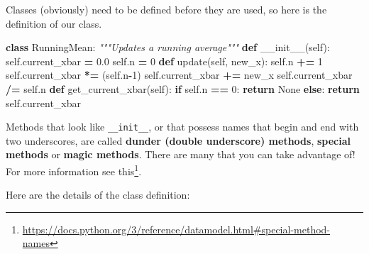 \documentclass[
  12pt,
  krantz2]{krantz}
\makeatletter
\newenvironment{Shaded}{\begin{snugshade}}{\end{snugshade}}
\newcommand{\CommentTok}[1]{\textcolor[rgb]{0.37,0.37,0.37}{\textit{#1}}}
\newcommand{\ControlFlowTok}[1]{\textcolor[rgb]{0.27,0.27,0.27}{\textbf{#1}}}
\newcommand{\DecValTok}[1]{\textcolor[rgb]{0.06,0.06,0.06}{#1}}
\newcommand{\FloatTok}[1]{\textcolor[rgb]{0.06,0.06,0.06}{#1}}
\newcommand{\FunctionTok}[1]{\textcolor[rgb]{0,0,0}{#1}}
\newcommand{\KeywordTok}[1]{\textcolor[rgb]{0.27,0.27,0.27}{\textbf{#1}}}
\newcommand{\NormalTok}[1]{#1}
\newcommand{\OperatorTok}[1]{\textcolor[rgb]{0.43,0.43,0.43}{\textbf{#1}}}
\newcommand{\VariableTok}[1]{\textcolor[rgb]{0,0,0}{#1}}
\renewcommand{\href}[2]{#2\footnote{\url{#1}}}
\newenvironment{kframe}{%
\medskip{}
\setlength{\fboxsep}{.8em}
 \def\at@end@of@kframe{}%
 \ifinner\ifhmode%
  \def\at@end@of@kframe{\end{minipage}}%
  \begin{minipage}{\columnwidth}%
 \fi\fi%
 \def\FrameCommand##1{\hskip\@totalleftmargin \hskip-\fboxsep
 \colorbox{shadecolor}{##1}\hskip-\fboxsep
     \hskip-\linewidth \hskip-\@totalleftmargin \hskip\columnwidth}%
 \MakeFramed {\advance\hsize-\width
   \@totalleftmargin\z@ \linewidth\hsize
   \@setminipage}}%
 {\par\unskip\endMakeFramed%
 \at@end@of@kframe}
\renewenvironment{Shaded}{\begin{kframe}}{\end{kframe}}
\makeatother
\begin{document}
Classes (obviously) need to be defined before they are used, so here is the definition of our class.

\begin{Shaded}
\begin{Highlighting}[]
\KeywordTok{class}\NormalTok{ RunningMean:}
    \CommentTok{"""Updates a running average"""}
    \KeywordTok{def} \FunctionTok{\_\_init\_\_}\NormalTok{(}\VariableTok{self}\NormalTok{):}
        \VariableTok{self}\NormalTok{.current\_xbar }\OperatorTok{=} \FloatTok{0.0}
        \VariableTok{self}\NormalTok{.n }\OperatorTok{=} \DecValTok{0}
    \KeywordTok{def}\NormalTok{ update(}\VariableTok{self}\NormalTok{, new\_x):}
        \VariableTok{self}\NormalTok{.n }\OperatorTok{+=} \DecValTok{1}
        \VariableTok{self}\NormalTok{.current\_xbar }\OperatorTok{*=}\NormalTok{ (}\VariableTok{self}\NormalTok{.n}\OperatorTok{{-}}\DecValTok{1}\NormalTok{)}
        \VariableTok{self}\NormalTok{.current\_xbar }\OperatorTok{+=}\NormalTok{ new\_x}
        \VariableTok{self}\NormalTok{.current\_xbar }\OperatorTok{/=} \VariableTok{self}\NormalTok{.n}
    \KeywordTok{def}\NormalTok{ get\_current\_xbar(}\VariableTok{self}\NormalTok{):}
        \ControlFlowTok{if} \VariableTok{self}\NormalTok{.n }\OperatorTok{==} \DecValTok{0}\NormalTok{:}
            \ControlFlowTok{return} \VariableTok{None}
        \ControlFlowTok{else}\NormalTok{:}
            \ControlFlowTok{return} \VariableTok{self}\NormalTok{.current\_xbar}
\end{Highlighting}
\end{Shaded}

\begin{rmd-details}
Methods that look like \texttt{\_\_init\_\_}, or that possess names that begin and end with two underscores, are called \textbf{dunder (double underscore) methods}, \textbf{special methods} or \textbf{magic methods}. There are many that you can take advantage of! For more information see \href{https://docs.python.org/3/reference/datamodel.html\#special-method-names}{this}.

\end{rmd-details}

Here are the details of the class definition:
\end{document}
